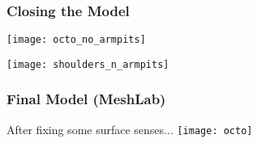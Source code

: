 \documentclass[14pt]{beamer}
\begin{document}
\begin{frame}
\frametitle{Closing the Model}


\begin{center}
\texttt{[image: octo\_no\_armpits]}
\end{center}

\vfill


\begin{center}
\texttt{[image: shoulders\_n\_armpits]}
\end{center}


\end{frame}

\begin{frame}
\frametitle{Final Model (MeshLab)}

\begin{center}
After fixing some surface senses...
\texttt{[image: octo]}
\end{center}

\end{frame}
\end{document}
